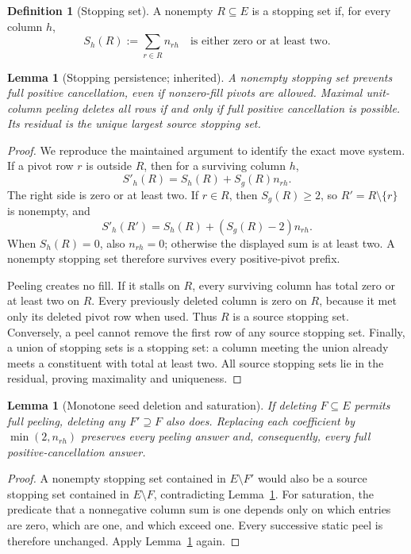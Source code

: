 \documentclass[11pt,letterpaper]{article}
\newtheorem{lemma}[theorem]{Lemma}
\theoremstyle{definition}
\newtheorem{definition}[theorem]{Definition}
\theoremstyle{remark}
\begin{document}
\begin{definition}[Stopping set]
A nonempty $R\subseteq E$ is a stopping set if, for every column $h$,
\[
 S_h(R):=\sum_{r\in R}n_{rh}\quad\text{is either zero or at least two.}
\]
\end{definition}

\begin{lemma}[Stopping persistence; inherited]\label{lem:stopping}
A nonempty stopping set prevents full positive cancellation, even if nonzero-fill
pivots are allowed. Maximal unit-column peeling deletes all rows if and only if
full positive cancellation is possible. Its residual is the unique largest source
stopping set.
\end{lemma}
\begin{proof}
We reproduce the maintained argument \cite{repo-peeling} to identify the exact
move system. If a pivot row $r$ is outside $R$, then for a surviving column $h$,
\[
 S'_h(R)=S_h(R)+S_g(R)n_{rh}.
\]
The right side is zero or at least two. If $r\in R$, then $S_g(R)\ge2$, so
$R'=R\setminus\{r\}$ is nonempty, and
\[
 S'_h(R')=S_h(R)+(S_g(R)-2)n_{rh}.
\]
When $S_h(R)=0$, also $n_{rh}=0$; otherwise the displayed sum is at least two.
A nonempty stopping set therefore survives every positive-pivot prefix.

Peeling creates no fill. If it stalls on $R$, every surviving column has total
zero or at least two on $R$. Every previously deleted column is zero on $R$,
because it met only its deleted pivot row when used. Thus $R$ is a source stopping
set. Conversely, a peel cannot remove the first row of any source stopping set.
Finally, a union of stopping sets is a stopping set: a column meeting the union
already meets a constituent with total at least two. All source stopping sets lie
in the residual, proving maximality and uniqueness.
\end{proof}

\begin{lemma}[Monotone seed deletion and saturation]\label{lem:monotone}
If deleting $F\subseteq E$ permits full peeling, deleting any $F'\supseteq F$
also does. Replacing each coefficient by $\min(2,n_{rh})$ preserves every peeling
answer and, consequently, every full positive-cancellation answer.
\end{lemma}
\begin{proof}
A nonempty stopping set contained in $E\setminus F'$ would also be a source
stopping set contained in $E\setminus F$, contradicting Lemma~\ref{lem:stopping}.
For saturation, the predicate that a nonnegative column sum is one depends only
on which entries are zero, which are one, and which exceed one. Every successive
static peel is therefore unchanged. Apply Lemma~\ref{lem:stopping} again.
\end{proof}
\end{document}
